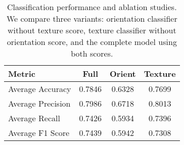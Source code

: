 \begin{table}[t!]
    \centering
    \caption{Classification performance and ablation studies. We compare three variants: orientation classifier without texture score, texture classifier without orientation score, and the complete model using both scores.}
    \label{table:class}
    \begin{tabular}{lccc}
    \hline
    \textbf{Metric} & \textbf{Full} & \textbf{Orient} & \textbf{Texture} \\ \hline
    Average Accuracy           & 0.7846 & 0.6328 & 0.7699 \\ 
    Average Precision     & 0.7986 & 0.6718 & 0.8013 \\ 
    Average Recall        & 0.7426 & 0.5934 & 0.7396 \\ 
    Average F1 Score      & 0.7439 & 0.5942 & 0.7308 \\ \hline
    \end{tabular}
    
    \end{table}
    